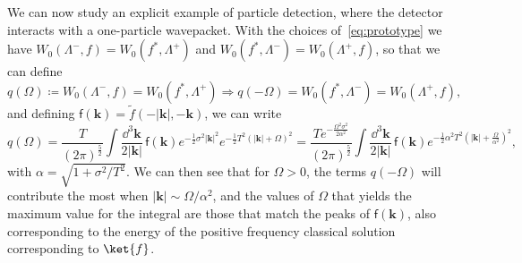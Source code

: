 \documentclass[letterpaper,12pt,titlepage,oneside,final]{book}
\newcommand{\mf}{\mathsf}%
\begin{document}
We can now study an explicit example of particle detection, where the detector interacts with a one-particle wavepacket. With the choices of~\eqref{eq:prototype} we have $W_0(\Lambda^-,f) = W_0(f^*,\Lambda^+)$ and $W_0(f^*,\Lambda^-) = W_0(\Lambda^+,f)$, so that we can define
\begin{equation}
    q(\Omega) \coloneqq  W_0(\Lambda^-,f) = W_0(f^*,\Lambda^+) \Rightarrow q(-\Omega) = W_0(f^*,\Lambda^-) = W_0(\Lambda^+,f),
\end{equation}
and defining $\mf{f}(\bm k) = \tilde{f}(-|\bm k|,-\bm k)$, we can write
\begin{equation}
    q(\Omega) = \frac{T}{(2\pi)^{\frac{5}{2}}} \int \frac{\dd^3 \bm k}{2|\bm k|} \,\mf{f}(\bm k)e^{- \frac{1}{2}\sigma^2 |\bm k|^2}e^{- \frac{1}{2}T^2 (|\bm k|+\Omega)^2} = \frac{T e^{- \frac{\Omega^2 \sigma^2}{2\alpha^2}}}{(2\pi)^{\frac{5}{2}}} \int \frac{\dd^3 \bm k}{2|\bm k|} \,\mf{f}(\bm k)e^{- \frac{1}{2}\alpha^2T^2 \left(|\bm k|+\frac{\Omega}{\alpha^2}\right)^2},
\end{equation}
with $\alpha = \sqrt{1+\sigma^2/T^2}$. We can then see that for $\Omega>0$, the terms $q(-\Omega)$ will contribute the most when $|\bm k| \sim \Omega/\alpha^2$, and the values of $\Omega$ that yields the maximum value for the integral are those that match the peaks of $\mf f(\bm k)$, also corresponding to the energy of the positive frequency classical solution corresponding to $\ket{f}$.
\end{document}
